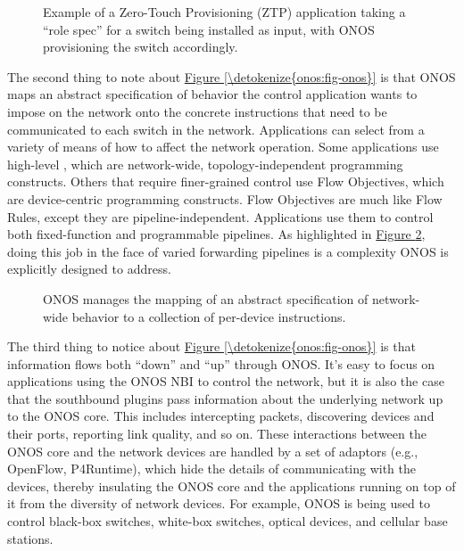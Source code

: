 \documentclass[letterpaper,11pt,english]{sphinxmanual}
\let\sphinxpxdimen\pdfpxdimen\else\newdimen\sphinxpxdimen
\begin{document}
\begin{figure}[htbp]
\centering
\capstart

\noindent\sphinxincludegraphics[width=400\sphinxpxdimen]{{Slide28}.png}
\caption{Example of a Zero-Touch Provisioning (ZTP) application taking a
“role spec” for a switch being installed as input, with ONOS
provisioning the switch accordingly.}\label{\detokenize{onos:id6}}\label{\detokenize{onos:fig-ztp}}\end{figure}

The second thing to note about \hyperref[\detokenize{onos:fig-onos}]{Figure \ref{\detokenize{onos:fig-onos}}} is that
ONOS maps an abstract specification of behavior the control
application wants to impose on the network onto the concrete
instructions that need to be communicated to each switch in the
network. Applications can select from a variety of means of how to
affect the network operation. Some applications use high-level
, which are network-wide, topology-independent programming
constructs. Others that require finer-grained control use Flow
Objectives, which are device-centric programming constructs. Flow
Objectives are much like Flow Rules, except they are
pipeline-independent. Applications use them to control both
fixed-function and programmable pipelines. As highlighted in
\hyperref[\detokenize{onos:fig-layers}]{Figure \ref{\detokenize{onos:fig-layers}}}, doing this job in the face of varied
forwarding pipelines is a complexity ONOS is explicitly designed to
address.

\begin{figure}[htbp]
\centering
\capstart

\noindent\sphinxincludegraphics[width=500\sphinxpxdimen]{{Slide27}.png}
\caption{ONOS manages the mapping of an abstract specification of
network-wide behavior to a collection of per-device instructions.}\label{\detokenize{onos:id7}}\label{\detokenize{onos:fig-layers}}\end{figure}

The third thing to notice about \hyperref[\detokenize{onos:fig-onos}]{Figure \ref{\detokenize{onos:fig-onos}}} is that
information flows both “down” and “up” through ONOS. It’s easy to
focus on applications using the ONOS NBI to control the network, but
it is also the case that the southbound plugins pass information about
the underlying network up to the ONOS core. This includes intercepting
packets, discovering devices and their ports, reporting link quality,
and so on. These interactions between the ONOS core and the network
devices are handled by a set of adaptors (e.g., OpenFlow, P4Runtime),
which hide the details of communicating with the devices, thereby
insulating the ONOS core and the applications running on top of it
from the diversity of network devices. For example, ONOS is being used
to control black-box switches, white-box switches, optical devices,
and cellular base stations.
\end{document}

